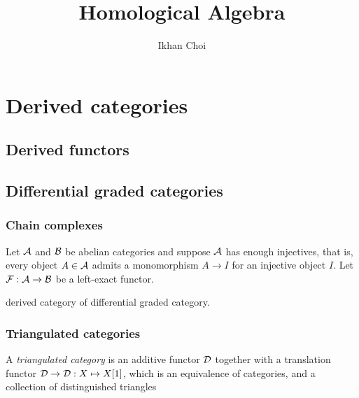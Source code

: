 \documentclass{../../large}
\begin{document}
\title{Homological Algebra}
\author{Ikhan Choi}
\maketitle
\tableofcontents







\part{Derived categories}

\chapter{Derived functors}



\chapter{Differential graded categories}

\section{Chain complexes}

\begin{prb}
Let $\mathcal{A}$ and $\mathcal{B}$ be abelian categories and suppose $\mathcal{A}$ has enough injectives, that is, every object $A\in\mathcal{A}$ admits a monomorphism $A\to I$ for an injective object $I$.
Let $\mathcal{F}:\mathcal{A}\to\mathcal{B}$ be a left-exact functor.

\end{prb}


derived category of differential graded category.



\section{Triangulated categories}


\begin{prb}
A \emph{triangulated category} is an additive functor $\mathcal{D}$ together with a translation functor $\mathcal{D}\to\mathcal{D}:X\mapsto X[1]$, which is an equivalence of categories, and a collection of distinguished triangles 

\end{prb}
\end{document}
